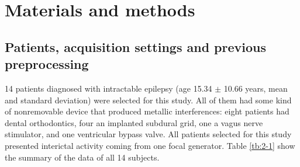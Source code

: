 \section{Materials and methods}

\subsection{Patients, acquisition settings and previous preprocessing}

14 patients diagnosed with intractable epilepsy (age 15.34 $\pm$ 10.66 years, mean and standard deviation) were selected for this study. All of them had some kind of nonremovable device that produced metallic interferences: eight patients had dental orthodontics, four an implanted subdural grid, one a vagus nerve stimulator, and one ventricular bypass valve. All patients selected for this study presented interictal activity coming from one focal generator. Table \ref{tb:2-1} show the summary of the data of all 14 subjects.

